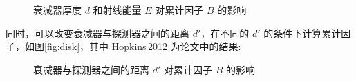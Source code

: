 \begin{figure}[!htb]
  \centering
  \resizebox{\linewidth}{!}{}
  \caption{\label{fig:thick}衰减器厚度 $d$ 和射线能量 $E$ 对累计因子 $B$ 的影响}
\end{figure}

同时，可以改变衰减器与探测器之间的距离 $d'$，在不同的 $d'$ 的条件下计算累计因子，如图\ref{fig:disk}，其中 Hopkins\,2012 为论文\cite{hopkins_linear_2012}中的结果:

\begin{figure}[!htb]
  \centering
  \resizebox{\linewidth}{!}{}
  \caption{\label{fig:dist}衰减器与探测器之间的距离 $d'$ 对累计因子 $B$ 的影响}
\end{figure}